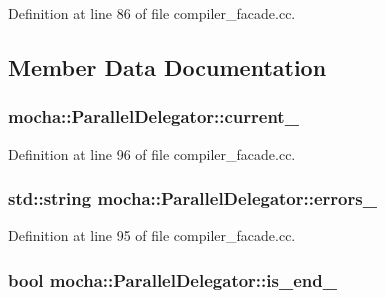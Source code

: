 Definition at line 86 of file compiler\_\-facade.cc.



\subsection{Member Data Documentation}
\hypertarget{classmocha_1_1_parallel_delegator_ad6a80805f55112ea6d0789dd7fee5b0b}{
\subsubsection[{current\_\-}]{ {\bf mocha::ParallelDelegator::current\_\-}}}
\label{classmocha_1_1_parallel_delegator_ad6a80805f55112ea6d0789dd7fee5b0b}


Definition at line 96 of file compiler\_\-facade.cc.

\hypertarget{classmocha_1_1_parallel_delegator_a64d6115c334c31c7e35f61c0c1628890}{
\subsubsection[{errors\_\-}]{\setlength{\rightskip}{0pt plus 5cm}std::string {\bf mocha::ParallelDelegator::errors\_\-}}}
\label{classmocha_1_1_parallel_delegator_a64d6115c334c31c7e35f61c0c1628890}


Definition at line 95 of file compiler\_\-facade.cc.

\hypertarget{classmocha_1_1_parallel_delegator_a526201fcedb64e3d734f5c409f93ecf2}{
\subsubsection[{is\_\-end\_\-}]{\setlength{\rightskip}{0pt plus 5cm}bool {\bf mocha::ParallelDelegator::is\_\-end\_\-}}}
\label{classmocha_1_1_parallel_delegator_a526201fcedb64e3d734f5c409f93ecf2}


